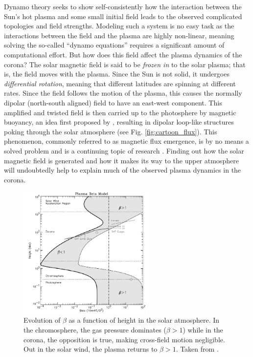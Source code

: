 %
\par Dynamo theory seeks to show self-consistently how the interaction between the Sun's hot plasma and some small initial field leads to the observed complicated topologies and field strengths. Modeling such a system is no easy task as the interactions between the field and the plasma are highly non-linear, meaning solving the so-called ``dynamo equations'' requires a significant amount of computational effort. But how does this field affect the plasma dynamics of the corona? The solar magnetic field is said to be \textit{frozen in} to the solar plasma; that is, the field moves with the plasma. Since the Sun is not solid, it undergoes \textit{differential rotation}, meaning that different latitudes are spinning at different rates. Since the field follows the motion of the plasma, this causes the normally dipolar (north-south aligned) field to have an east-west component. This amplified and twisted field is then carried up to the photosphere by magnetic buoyancy, an idea first proposed by \citep{parker_formation_1955}, resulting in dipolar loop-like structures poking through the solar atmosphere (see Fig. \ref{fig:cartoon_flux}). This phenomenon, commonly referred to as magnetic flux emergence, is by no means a solved problem and is a continuing topic of research \citep[see][]{cheung_flux_2014}. Finding out how the solar magnetic field is generated and how it makes its way to the upper atmosphere will undoubtedly help to explain much of the observed plasma dynamics in the corona. 
%
\begin{figure}[htbp]
	\centering
	\includegraphics[width=0.6\textwidth]{figures/plasma_beta.png}
	\caption{Evolution of $\beta$ as a function of height in the solar atmosphere. In the chromosphere, the gas pressure dominates ($\beta>1$) while in the corona, the opposition is true, making cross-field motion negligible. Out in the solar wind, the plasma returns to $\beta>1$. Taken from \citet{gary_plasma_2001}.}
	\label{fig:plasma_beta}
\end{figure}
%
